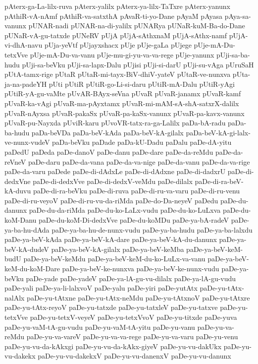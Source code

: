 {pAterx-ga-La-lilx-ruva
pAterx-yalilx
pAterx-ya-lilx-TaTxre
pAterx-yanunx
pAthiR-vA-nAmf
pAthiR-va-satxthA
pAvaR-ti-yo-Dane
pAyaM
pAyasa
pAya-sa-vanunx
pUNAR-nadi
pUNAR-na-di-yalilx
pUNARya
pUNaR-kuM-Ba-do-Dane
pUNaR-vA-gu-tatxde
pUNeRV
pUjA
pUjA-sAthxnaM
pUjA-sAthx-namf
pUjA-vi-dhA-navu
pUja-yeVtf
pUjayxshacx
pUje
pUje-gaLa
pUjege
pUje-mA-Du-tetxVve
pUje-mA-Du-va-vanu
pUje-mu-gi-yu-va-va-rege
pUje-yanunx
pUji-sa-ba-hudu
pUji-sa-beVku
pUji-sa-lapx-Dalu
pUjisi
pUji-si-darU
pUji-su-vAga
pUruSaH
pUtA-tamx-rige
pUtaR
pUtaR-mi-tayx-BiV-dhiV-yateV
pUtaR-ve-nunxva
pUta-ja-na-padeYH
pUti
pUtiR
pUtiR-go-Li-si-daru
pUtiR-mA-Dalu
pUtiR-yAgi
pUtiR-yA-gu-vaMte
pUvAR-BAyx-seVna
pUvaR
pUvaR-janamx
pUvaR-kamf
pUvaR-ka-vAgi
pUvaR-ma-pAyxtamx
pUvaR-mi-mAM-sA-shA-satxrX-dalilx
pUvaR-nAyxsa
pUvaR-pakaSx
pUvaR-pa-kaSx-vanunx
pUvaR-pa-kavx-vanunx
pUvaR-pu-Nayxda
pUviR-karu
pUvoVR-tatx-ra-ga-Lalilx
paDa-bA-radu
paDa-ba-hudu
paDa-beVDa
paDa-beV-kAda
paDa-beV-kA-gilalx
paDa-beV-kA-gi-lalx-ve-nunx-vudeV
paDa-beVku
paDade
paDa-kU-Dadu
paDalu
paDe-dA-yitu
paDedU
paDeda
paDe-danoV
paDe-danu
paDe-dare
paDe-da-reMdu
paDe-da-reVneV
paDe-daru
paDe-da-vana
paDe-da-va-nige
paDe-da-vanu
paDe-da-va-rige
paDe-da-varu
paDede
paDe-di-dAdxLe
paDe-di-dAdxne
paDe-di-dadxrU
paDe-di-dedxVne
paDe-di-dedxVve
paDe-di-dedxV-veMdu
paDe-dilalx
paDe-di-ra-beV-kA-duvu
paDe-di-ra-beVku
paDe-di-ruva
paDe-di-ru-va-varu
paDe-di-ru-venu
paDe-di-ru-veyoV
paDe-di-ru-vu-da-riMda
paDe-do-Da-neyeV
paDedu
paDe-du-danunx
paDe-du-da-riMda
paDe-du-ko-LaLx-vudu
paDe-du-ko-LuLxva
paDe-du-koM-Danu
paDe-du-koM-Di-dedxVve
paDe-du-koMDu
paDe-ya-bA-radeV
paDe-ya-ba-hu-dAda
paDe-ya-ba-hu-de-nunx-vudu
paDe-ya-ba-hudu
paDe-ya-ba-lalxdu
paDe-ya-beV-kAda
paDe-ya-beV-kA-dare
paDe-ya-beV-kA-du-danunx
paDe-ya-beV-kA-dudeV
paDe-ya-beV-kA-gilalx
paDe-ya-beV-keMba
paDe-ya-beV-keM-budU
paDe-ya-beV-keMdu
paDe-ya-beV-keM-du-ko-LuLx-va-vanu
paDe-ya-beV-keM-du-koM-Dare
paDe-ya-beV-ke-nunxva
paDe-ya-beV-ke-nunx-vudu
paDe-ya-beVku
paDe-yade
paDe-yadeV
paDe-ya-lA-gu-vu-dilalx
paDe-ya-lA-gu-vudu
paDe-yali
paDe-ya-li-lalxvoV
paDe-yalu
paDe-yiri
paDe-yutAtx
paDe-yu-tAtx-nalAlx
paDe-yu-tAtxne
paDe-yu-tAtx-neMdu
paDe-yu-tAtxnoV
paDe-yu-tAtxre
paDe-yu-tAtx-reyoV
paDe-yu-tatxde
paDe-yu-tatxleV
paDe-yu-tatxve
paDe-yu-tetxVve
paDe-yu-tetxV-veyeV
paDe-yu-tetxVvoV
paDe-yu-titxde
paDe-yuva
paDe-yu-vaM-tA-gu-vudu
paDe-yu-vaM-tA-yitu
paDe-yu-vanu
paDe-yu-va-reMdu
paDe-yu-va-vareV
paDe-yu-va-va-rege
paDe-yu-va-varu
paDe-yu-venu
paDe-yu-vu-da-kAkxgi
paDe-yu-vu-da-kAkx-giyeV
paDe-yu-vu-dakUkx
paDe-yu-vu-dakekx
paDe-yu-vu-dakekxV
paDe-yu-vu-danenxV
paDe-yu-vu-danunx
}
